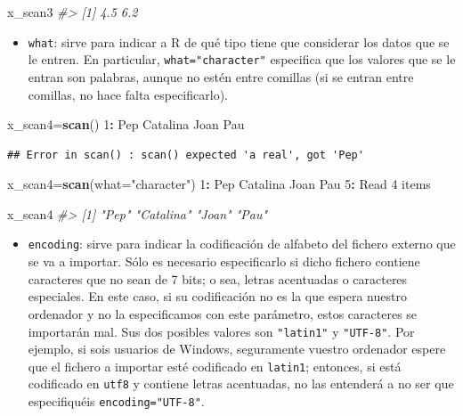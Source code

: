 \documentclass[
]{book}
\newenvironment{Shaded}{\begin{snugshade}}{\end{snugshade}}
\newcommand{\CommentTok}[1]{\textcolor[rgb]{0.56,0.35,0.01}{\textit{#1}}}
\newcommand{\DataTypeTok}[1]{\textcolor[rgb]{0.13,0.29,0.53}{#1}}
\newcommand{\DecValTok}[1]{\textcolor[rgb]{0.00,0.00,0.81}{#1}}
\newcommand{\KeywordTok}[1]{\textcolor[rgb]{0.13,0.29,0.53}{\textbf{#1}}}
\newcommand{\NormalTok}[1]{#1}
\newcommand{\OperatorTok}[1]{\textcolor[rgb]{0.81,0.36,0.00}{\textbf{#1}}}
\newcommand{\StringTok}[1]{\textcolor[rgb]{0.31,0.60,0.02}{#1}}
\providecommand{\tightlist}{%
  \setlength{\itemsep}{0pt}\setlength{\parskip}{0pt}}
\theoremstyle{definition}
\theoremstyle{definition}
\theoremstyle{definition}
\theoremstyle{remark}
\begin{document}
\begin{Shaded}
\begin{Highlighting}[]
\NormalTok{x\_scan3}
\CommentTok{\#\textgreater{} [1] 4.5 6.2}
\end{Highlighting}
\end{Shaded}

\begin{itemize}
\tightlist
\item
  \texttt{what}: sirve para indicar a R de qué tipo tiene que considerar los datos que se le entren. En particular,
  \texttt{what="character"} especifica que los valores que se le entran son palabras, aunque no estén entre comillas (si se entran entre comillas, no hace falta especificarlo).
\end{itemize}

\begin{Shaded}
\begin{Highlighting}[]
\NormalTok{x\_scan4=}\KeywordTok{scan}\NormalTok{()}
\DecValTok{1}\OperatorTok{:}\StringTok{  }\NormalTok{Pep Catalina Joan Pau}
\end{Highlighting}
\end{Shaded}

\begin{verbatim}
## Error in scan() : scan() expected 'a real', got 'Pep'
\end{verbatim}

\begin{Shaded}
\begin{Highlighting}[]
\NormalTok{x\_scan4=}\KeywordTok{scan}\NormalTok{(}\DataTypeTok{what=}\StringTok{"character"}\NormalTok{)}
\DecValTok{1}\OperatorTok{:}\StringTok{ }\NormalTok{Pep Catalina Joan Pau}
\DecValTok{5}\OperatorTok{:}\StringTok{ }
\NormalTok{Read }\DecValTok{4}\NormalTok{ items}
\end{Highlighting}
\end{Shaded}

\begin{Shaded}
\begin{Highlighting}[]
\NormalTok{x\_scan4}
\CommentTok{\#\textgreater{} [1] "Pep"      "Catalina" "Joan"     "Pau"}
\end{Highlighting}
\end{Shaded}

\begin{itemize}
\tightlist
\item
  \texttt{encoding}: sirve para indicar la codificación de alfabeto del fichero externo que se va a importar. Sólo es necesario especificarlo si dicho fichero contiene caracteres que no sean de 7 bits; o sea, letras acentuadas o caracteres especiales. En este caso, si su codificación no es la que espera nuestro ordenador y no la especificamos con este parámetro, estos caracteres se importarán mal. Sus dos posibles valores son \texttt{"latin1"} y \texttt{"UTF-8"}. Por ejemplo, si sois usuarios de Windows, seguramente vuestro ordenador espere que el fichero a importar esté codificado en \texttt{latin1}; entonces, si está codificado en \texttt{utf8} y contiene letras acentuadas, no las entenderá a no ser que especifiquéis \texttt{encoding="UTF-8"}.
\end{itemize}
\end{document}
